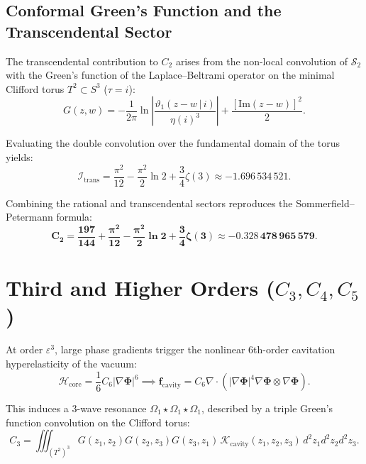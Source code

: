 \documentclass[12pt,a4paper]{article}
\begin{document}
	\subsection{Conformal Green's Function and the Transcendental Sector}
	The transcendental contribution to $C_2$ arises from the non-local convolution of $\mathcal{S}_2$ with the Green's function of the Laplace--Beltrami operator on the minimal Clifford torus $T^2 \subset S^3$ ($\tau = i$):
	\begin{equation}
		G(z, w) = -\frac{1}{2\pi} \ln \left| \frac{\vartheta_1(z - w \,|\, i)}{\eta(i)^3} \right| + \frac{[\mathrm{Im}(z - w)]^2}{2}.
	\end{equation}
	
	Evaluating the double convolution over the fundamental domain of the torus yields:
	\begin{equation}
		\mathcal{I}_{\text{trans}} = \frac{\pi^2}{12} - \frac{\pi^2}{2}\ln 2 + \frac{3}{4}\zeta(3) \approx -1.696\,534\,521.
	\end{equation}
	
	Combining the rational and transcendental sectors reproduces the Sommerfield--Petermann formula:
	\begin{equation}
		\mathbf{C_2 = \frac{197}{144} + \frac{\pi^2}{12} - \frac{\pi^2}{2}\ln 2 + \frac{3}{4}\zeta(3) \approx -0.328\,478\,965\,579}.
	\end{equation}
	
	\section{Third and Higher Orders ($C_3, C_4, C_5$)}
	
	At order $\varepsilon^3$, large phase gradients trigger the nonlinear 6th-order cavitation hyperelasticity of the vacuum:
	\begin{equation}
		\mathcal{H}_{\text{core}} = \frac{1}{6} C_6 |\nabla \boldsymbol{\Phi}|^6 \implies \mathbf{f}_{\text{cavity}} = C_6 \nabla \cdot \left( |\nabla \boldsymbol{\Phi}|^4 \nabla \boldsymbol{\Phi} \otimes \nabla \boldsymbol{\Phi} \right).
	\end{equation}
	
	This induces a 3-wave resonance $\Omega_1 \star \Omega_1 \star \Omega_1$, described by a triple Green's function convolution on the Clifford torus:
	\begin{equation}
		C_3 = \iiint_{(T^2)^3} G(z_1, z_2) G(z_2, z_3) G(z_3, z_1) \, \mathcal{K}_{\text{cavity}}(z_1, z_2, z_3) \, d^2z_1 d^2z_2 d^2z_3.
	\end{equation}
	
\end{document}
